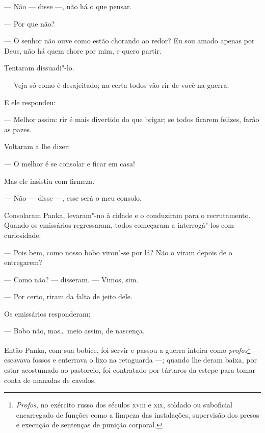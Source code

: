 --- Não --- disse ---, não há o que pensar.

--- Por que não?

--- O senhor não ouve como estão chorando ao redor? Eu sou amado apenas
por Deus, não há quem chore por mim, e quero partir.

Tentaram dissuadi"-lo.

--- Veja só como é desajeitado; na certa todos vão rir de você na
guerra.

E ele respondeu:

--- Melhor assim: rir é mais divertido do que brigar; se todos ficarem
felizes, farão as pazes.

Voltaram a lhe dizer:

--- O melhor é se consolar e ficar em casa!

Mas ele insistiu com firmeza.

--- Não --- disse ---, esse será o meu consolo.

Consolaram Panka, levaram"-no à cidade e o conduziram para o
recrutamento. Quando os emissários regressaram, todos começaram a
interrogá"-los com curiosidade:

--- Pois bem, como nosso bobo virou"-se por lá? Não o viram depois de o
entregarem?

--- Como não? --- disseram. --- Vimos, sim.

--- Por certo, riram da falta de jeito dele.


Os emissários responderam:

--- Bobo não, mas\ldots{} meio assim, de nascença.

Então Panka, com sua bobice, foi servir e passou a guerra inteira como
\emph{profos}\footnote{\emph{Profos,} no exército russo dos séculos
  \textsc{xviii} e \textsc{xix}, soldado ou suboficial encarregado de funções como a
  limpeza das instalações, supervisão dos presos e execução de sentenças
  de punição corporal.} --- escavava fossos e enterrava o lixo na
retaguarda ---; quando lhe deram baixa, por estar acostumado ao
pastoreio, foi contratado por tártaros da estepe para tomar conta de
manadas de cavalos.

